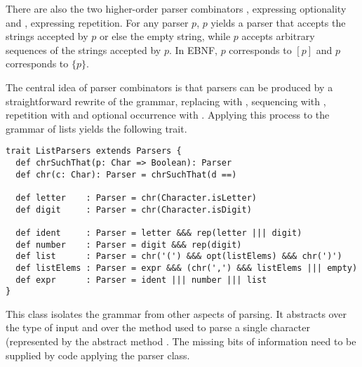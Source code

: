 {There are also the two higher-order parser combinators ,
expressing optionality and , expressing repetition.
For any parser $p$, $p$\code{)} yields a parser that
accepts the strings accepted by $p$ or else the empty string, while
$p$\code{)} accepts arbitrary sequences of the strings accepted by
$p$. In EBNF, $p$\code{)} corresponds to $[p]$ and
$p$\code{)} corresponds to $\{p\}$.

The central idea of parser combinators is that parsers can be produced
by a straightforward rewrite of the grammar, replacing \code{::=} with
\code{=}, sequencing with
\code{&}, repetition  with
 and optional occurrence \code{[...]} with .
Applying this process to the grammar of lists
yields the following trait.
\begin{lstlisting}
trait ListParsers extends Parsers {
  def chrSuchThat(p: Char => Boolean): Parser
  def chr(c: Char): Parser = chrSuchThat(d ==)

  def letter    : Parser = chr(Character.isLetter)
  def digit     : Parser = chr(Character.isDigit)

  def ident     : Parser = letter &&& rep(letter ||| digit)
  def number    : Parser = digit &&& rep(digit)
  def list      : Parser = chr('(') &&& opt(listElems) &&& chr(')')
  def listElems : Parser = expr &&& (chr(',') &&& listElems ||| empty)
  def expr      : Parser = ident ||| number ||| list
}
\end{lstlisting}
This class isolates the grammar from other aspects of parsing. It
abstracts over the type of input 
and over the method used to parse a single character
(represented by the abstract method . The missing bits of information need to be supplied by code
applying the parser class.

}
